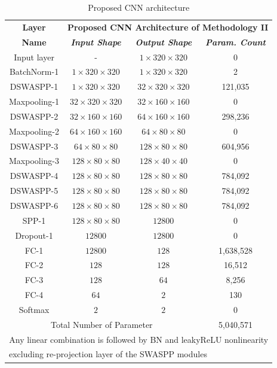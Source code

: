 \renewcommand{\arraystretch}{1.5}
\begin{table}[htbp]
    \caption{Proposed CNN architecture}
    \begin{center}
    \begin{tabular}{|c|c|c|c|}
    \hline
    \textbf{Layer}&\multicolumn{3}{|c|}{\textbf{Proposed CNN Architecture of Methodology II}} \\
    \cline{2-4} 
    \textbf{Name} & \textbf{\textit{Input Shape}}& \textbf{\textit{Output Shape}}& \textbf{\textit{Param. Count}} \\
    \hline
    Input layer & - & $1 \times 320 \times 320$ & 0 \\
    \hline
    BatchNorm-1 & $1 \times 320 \times 320$ & $1 \times 320 \times 320$ & 2 \\
    \hline
    DSWASPP-1& $1 \times 320 \times 320$ & $32 \times 320 \times 320$ & 121,035  \\
    \hline
    Maxpooling-1& $32 \times 320 \times 320$ &$32 \times 160 \times 160$ & 0 \\
    \hline
    DSWASPP-2& $32 \times 160 \times 160$ & $64 \times 160 \times 160$ & 298,236  \\
    \hline
    Maxpooling-2 & $64 \times 160 \times 160$ & $64 \times 80 \times 80$ &0  \\
    \hline
    DSWASPP-3  & $64 \times 80 \times 80$ & $128 \times 80 \times 80$ & 604,956  \\
    \hline
    Maxpooling-3 & $128 \times 80 \times 80$ & $128 \times 40 \times 40$ & 0  \\
    \hline
    DSWASPP-4  & $128 \times 80 \times 80$ & $128 \times 80 \times 80$ & 784,092 \\
    \hline
    DSWASPP-5  & $128 \times 80 \times 80$ & $128 \times 80 \times 80$ & 784,092 \\
    \hline
    DSWASPP-6  & $128 \times 80 \times 80$ & $128 \times 80 \times 80$ & 784,092 \\
    \hline
    SPP-1 & $128 \times 80 \times 80$ & $12800$ & 0 \\
    \hline
    Dropout-1 & $12800$ & $12800$ & 0 \\
    \hline
    FC-1 & $12800$ & $128$ & 1,638,528 \\
    \hline
    FC-2 & $128$ & $128$ & 16,512 \\
    \hline
    FC-3 & $128$ & $64$ & 8,256 \\
    \hline
    FC-4 & $64$ & $2$ & 130 \\
    \hline
    Softmax & $2$ & $2$ & 0 \\
    \hline
    \hline
    \multicolumn{3}{|c|}{Total Number of Parameter}&5,040,571\\
    \hline
    \multicolumn{4}{c}{Any linear combination is followed by BN and leakyReLU nonlinearity}\\
    \multicolumn{4}{l}{excluding re-projection layer of the SWASPP modules}
    \end{tabular}
    \label{PCNN}
    \end{center}
    \end{table}